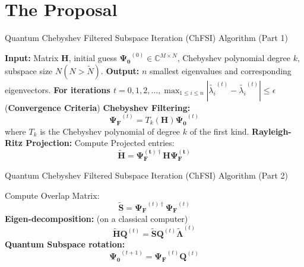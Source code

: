 \documentclass[serif, aspectratio=169]{beamer}
\begin{document}
\section{The Proposal}
\begin{frame}{Quantum Chebyshev Filtered Subspace Iteration (ChFSI) Algorithm (Part 1)}
    \begin{algorithm}[H]
        \caption{Quantum Chebyshev Filtered Subspace Iteration (ChFSI) Algorithm}
        \begin{algorithmic}[1]
            \State \textbf{Input:} Matrix $\mathbf{H}$, initial guess $\boldsymbol{\Psi_0}^{(0)} \in \mathbb{C}^{M\times N}$, Chebyshev polynomial degree $k$, subspace size $N (N > \tilde{N})$.
            \State \textbf{Output:} $n$ smallest eigenvalues and corresponding eigenvectors.
            \State \textbf{For iterations $t=0,1,2,\ldots,\max_{1\leq i\leq n} |\tilde{\lambda_i}^{(t)} - \tilde{\lambda_i} ^{(t)} |\leq\epsilon$} (\textbf{Convergence Criteria}) 
            \State \hspace{1em} \textbf{Chebyshev Filtering:} 
            \[
            \boldsymbol{\Psi_F}^{(t)} = T_k (\mathbf{H})\boldsymbol{\Psi_{0}}^{(t)}
            \]
            \hspace{1em} where $T_k$ is the Chebyshev polynomial of degree $k$ of the first kind.
            \State \hspace{1em} \textbf{Rayleigh-Ritz Projection:}
            \newline
            \hspace{1em} Compute Projected entries:
            \[
            \mathbf{\tilde{H}} = \boldsymbol{\Psi_F^{(t)\dagger}}\mathbf{H}\boldsymbol{\Psi_F^{(t)}}
            \]
        \end{algorithmic}
    \end{algorithm}
\end{frame}

\begin{frame}{Quantum Chebyshev Filtered Subspace Iteration (ChFSI) Algorithm (Part 2)}
    \begin{algorithm}[H]
        \begin{algorithmic}[1]
            \State \hspace{1em} Compute Overlap Matrix:
            \[
            \mathbf{\tilde{S}}=\boldsymbol{\Psi_F}^{(t)\dagger} \boldsymbol{\Psi_F}^{(t)}
            \]
            \State \hspace{1em} \textbf{Eigen-decomposition:} (on a classical computer)  
            \[
            \mathbf{\tilde{H}}\mathbf{Q}^{(t)}=\mathbf{\tilde{S}}\mathbf{Q}^{(t)}\boldsymbol{\tilde{\Lambda}}^{(t)}
            \]
            \State \hspace{1em} \textbf{Quantum Subspace rotation:}
            \[
            \boldsymbol{\Psi_0}^{(t+1)}=\boldsymbol{\Psi_F}^{(t)}\mathbf{Q}^{(t)}
            \]
        \end{algorithmic}
    \end{algorithm}
\end{frame}
\end{document}
